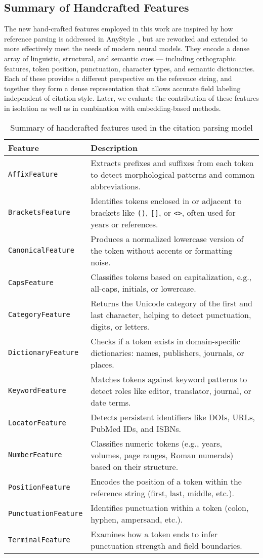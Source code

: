 \subsection*{Summary of Handcrafted Features}
The new hand-crafted features employed in this work are inspired by how reference parsing is addressed in AnyStyle~\cite{anystyle}, but are reworked and extended to more effectively meet the needs of modern neural models. They encode a dense array of linguistic, structural, and semantic cues — including orthographic features, token position, punctuation, character types, and semantic dictionaries. Each of these provides a different perspective on the reference string, and together they form a dense representation that allows accurate field labeling independent of citation style. Later, we evaluate the contribution of these features in isolation as well as in combination with embedding-based methods.
\renewcommand{\arraystretch}{1.3}
\begin{table}[ht]
\centering
\caption{Summary of handcrafted features used in the citation parsing model}
\label{tab:handcrafted-features}
\begin{tabular}{p{4cm}p{10cm}}
\toprule
\textbf{Feature} & \textbf{Description} \\
\midrule
\texttt{AffixFeature} & Extracts prefixes and suffixes from each token to detect morphological patterns and common abbreviations. \\
\texttt{BracketsFeature} & Identifies tokens enclosed in or adjacent to brackets like \texttt{()}, \texttt{[]}, or \texttt{<>}, often used for years or references. \\
\texttt{CanonicalFeature} & Produces a normalized lowercase version of the token without accents or formatting noise. \\
\texttt{CapsFeature} & Classifies tokens based on capitalization, e.g., all-caps, initials, or lowercase. \\
\texttt{CategoryFeature} & Returns the Unicode category of the first and last character, helping to detect punctuation, digits, or letters. \\
\texttt{DictionaryFeature} & Checks if a token exists in domain-specific dictionaries: names, publishers, journals, or places. \\
\texttt{KeywordFeature} & Matches tokens against keyword patterns to detect roles like editor, translator, journal, or date terms. \\
\texttt{LocatorFeature} & Detects persistent identifiers like DOIs, URLs, PubMed IDs, and ISBNs. \\
\texttt{NumberFeature} & Classifies numeric tokens (e.g., years, volumes, page ranges, Roman numerals) based on their structure. \\
\texttt{PositionFeature} & Encodes the position of a token within the reference string (first, last, middle, etc.). \\
\texttt{PunctuationFeature} & Identifies punctuation within a token (colon, hyphen, ampersand, etc.). \\
\texttt{TerminalFeature} & Examines how a token ends to infer punctuation strength and field boundaries. \\
\bottomrule
\end{tabular}
\end{table}
\renewcommand{\arraystretch}{1.0}



